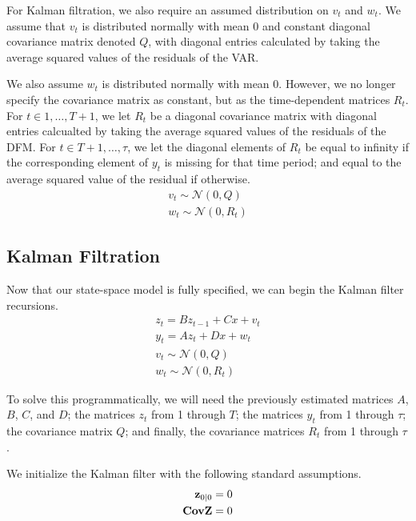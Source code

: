 \documentclass[11pt, letterpaper]{article}\usepackage[]{graphicx}\usepackage[]{color}
\newcommand{\vv}[1]{\textcolor{black}{\mathbf{#1}}}
\begin{document}
For Kalman filtration, we also require an assumed distribution on $v_t$ and $w_t$. We assume that $v_t$ is distributed normally with mean 0 and constant diagonal covariance matrix denoted $Q$, with diagonal entries calculated by taking the average squared values of the residuals of the VAR.

We also assume $w_t$ is distributed normally with mean $0$. However, we no longer specify the covariance matrix as constant, but as the time-dependent matrices $R_t$. For $t \in 1, \dots, T+1$, we let $R_t$ be a diagonal covariance matrix with diagonal entries calcualted by taking the average squared values of the residuals of the DFM. For $t \in T+1, \dots, \tau$, we let the diagonal elements of $R_t$ be equal to infinity if the corresponding element of $y_t$ is missing for that time period; and equal to the average squared value of the residual if otherwise.
\begin{align*}
	v_t \sim \mathcal{N}(0, Q)\\
	w_t \sim \mathcal{N}(0, R_t)
\end{align*}

\subsection{Kalman Filtration}
Now that our state-space model is fully specified, we can begin the Kalman filter recursions.
\begin{align*}
	z_t = B z_{t-1} + Cx + v_t\\
	y_t = A z_t + Dx + w_t\\
	v_t \sim \mathcal{N}(0, Q)\\
	w_t \sim \mathcal{N}(0, R_t)
\end{align*}

To solve this programmatically, we will need the previously estimated matrices $A$, $B$, $C$, and $D$; the matrices $z_t$ from 1 through $T$; the matrices $y_t$ from 1 through $\tau$; the covariance matrix $Q$; and finally, the covariance matrices $R_t$ from 1 through $\tau$.

We initialize the Kalman filter with the following standard assumptions. 
\begin{align*}
	\vv{z}_{0|0} = 0\\
	\vv{CovZ} = 0
\end{align*}
\end{document}
